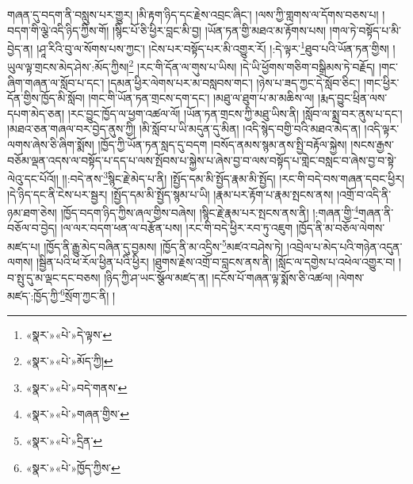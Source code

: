 གཞན་དུ་བདག་ནི་བསླུས་པར་གྱུར། །མི་རྟག་ཉིད་དང་རྗེས་འབྲང་ཞིང་། །ལས་ཀྱི་གླགས་ལ་དོགས་བཅས་པ། །བདག་གི་ལྕེ་འདི་ཉིད་ཀྱིས་གོ། །སྙིང་པོ་ཅི་ཕྱིར་བླང་མི་བྱ། །ཡོན་ཏན་གྱི་མཐའ་མ་རྟོགས་པས། །གལ་ཏེ་བསྟོད་པ་མི་བྱེད་ན། །ཤཱ་རིའི་བུ་ལ་སོགས་པས་ཀྱང་། །ངེས་པར་བསྟོད་པར་མི་འགྱུར་རོ། །:དེ་ལྟར་\footnote{«སྣར་»«པེ་»དེ་ལྟས་}ཐུབ་པའི་ཡོན་ཏན་གྱིས། །ཡུལ་ལྟ་གྲངས་མེད་ཤེས་:མོད་ཀྱིས།\footnote{«སྣར་»«པེ་»མོད་ཀྱི།} །རང་གི་དོན་ལ་གུས་པ་ཡིས། །དེ་ཡི་ཕྱོགས་གཅིག་བསྒྲིམས་ཏེ་བརྗོད། །གང་ཞིག་གཞན་ལ་སློབ་པ་དང་། །དམན་ཕྱིར་ལེགས་པར་མ་བསླབས་གང་། །ཉེས་པ་ཟད་ཀྱང་དེ་སློབ་ཅིང་། །གང་ཕྱིར་དོན་གྱིས་ཁྱོད་མི་སློབ། །གང་གི་ཡོན་ཏན་གྲངས་དག་དང་། །མཐུ་ལ་ཐུག་པ་མ་མཆིས་ལ། །རྨད་བྱུང་ཕྲིན་ལས་དཔག་མེད་ཅན། །རང་བྱུང་ཁྱོད་ལ་ཕྱག་འཚལ་ལོ། །ཡོན་ཏན་གྲངས་ཀྱི་མཐུ་ཡིས་ནི། །སློབ་ལ་སྨྲ་བར་ནུས་པ་དང་། །མཐའ་ཅན་གཞལ་བར་བྱེད་ནུས་ཀྱི། །མི་སློབ་པ་ཡི་མདུན་དུ་མིན། །འདི་སྙེད་བགྱི་བའི་མཐའ་མེད་ན། །འདི་ལྟར་ལགས་ཞེས་ཅི་ཞིག་སྨོས། །ཁྱོད་ཀྱི་ཡོན་ཏན་སླད་དུ་བདག །བསོད་ནམས་སྙམ་ནས་སྤྱི་བརྟོལ་སྐྱེས། །སངས་རྒྱས་བཅོམ་ལྡན་འདས་ལ་བསྟོད་པ་དད་པ་ལས་སྤོབས་པ་སྐྱེས་པ་ཞེས་བྱ་བ་ལས་བསྟོད་པ་གླེང་བསླང་བ་ཞེས་བྱ་བ་སྟེ་ལེའུ་དང་པོའོ།། །།:བདེ་ནས་\footnote{«སྣར་»«པེ་»བདེ་གནས་}སྙིང་རྗེ་མེད་པ་ནི། །སྤྱོད་དམ་མི་སྤྱོད་རྣམ་མི་སྤྱོད། །རང་གི་བདེ་བས་གཞན་དབང་ཕྱིར། །དེ་ཉིད་དང་ནི་ངེས་པར་སྦྱར། །སྤྱོད་དམ་མི་སྤྱོད་སྙམ་པ་ཡི། །རྣམ་པར་རྟོག་པ་རྣམ་སྤངས་ནས། །འགྲོ་བ་འདི་ནི་ཉམ་ཐག་ཅེས། །ཁྱོད་བདག་ཉིད་ཀྱིས་ཞལ་གྱིས་བཞེས། །སྙིང་རྗེ་རྣམ་པར་སྤངས་ནས་ནི། །:གཞན་གྱི་\footnote{«སྣར་»«པེ་»གཞན་གྱིས་}གཞན་ནི་བཅོལ་བ་བྱེད། །ལ་ལར་བདག་ཕན་ལ་བརྩོན་པས། །རང་གི་བདེ་ཕྱིར་རབ་ཏུ་འཇུག །ཁྱོད་ནི་མ་བཅོལ་ལེགས་མཛད་པ། །ཁྱོད་ནི་རྒྱུ་མེད་བཞིན་དུ་བྱམས། །ཁྱོད་ནི་མ་འདྲིས་\footnote{«སྣར་»«པེ་»དྲིན་}མཛའ་བཤེས་ཏེ། །འབྲེལ་པ་མེད་པའི་གཉེན་འདུན་ལགས། །སྦྱིན་པའི་ཕ་རོལ་ཕྱིན་པའི་ཕྱིར། །ཐུགས་རྗེས་འགྲོ་བ་བླངས་ནས་ནི། །སློང་ལ་དགྱེས་པ་འཕེལ་འགྱུར་བ། །བ་སྤུ་དུ་མ་ལྡང་དང་བཅས། །ཉིད་ཀྱི་ཤ་ཡང་སྩོལ་མཛད་ན། །དངོས་པོ་གཞན་ལྟ་སྨོས་ཅི་འཚལ། །ལེགས་མཛད་:ཁྱོད་ཀྱི་\footnote{«སྣར་»«པེ་»ཁྱོད་ཀྱིས་}སྲོག་ཀྱང་ནི། །
